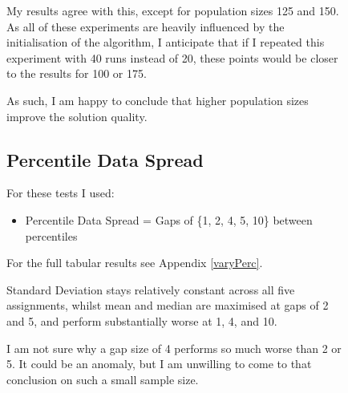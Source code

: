 \begin{figure}[p]
    My results agree with this, except for population sizes 125 and 150. As all of these experiments are heavily influenced by the initialisation of the algorithm, I anticipate that if I repeated this experiment with 40 runs instead of 20, these points would be closer to the results for 100 or 175. \newline
    
    As such, I am happy to conclude that higher population sizes improve the solution quality.
\end{figure}

\begin{figure}[p]
    \setlength{\parindent}{24pt}
    \subsection{Percentile Data Spread}
    For these tests I used:
    \begin{itemize}
        \item Percentile Data Spread = Gaps of \{1, 2, 4, 5, 10\} between percentiles
    \end{itemize}
    
    \begin{center}
    \end{center}
    
    \noindent For the full tabular results see Appendix \ref{varyPerc}.
    \vspace{4mm}
    
    {\centering
    }
    \newline
    
    Standard Deviation stays relatively constant across all five assignments, whilst mean and median are maximised at gaps of 2 and 5, and perform substantially worse at 1, 4, and 10. \newline
    
    I am not sure why a gap size of 4 performs so much worse than 2 or 5. It could be an anomaly, but I am unwilling to come to that conclusion on such a small sample size.
    
\end{figure}

